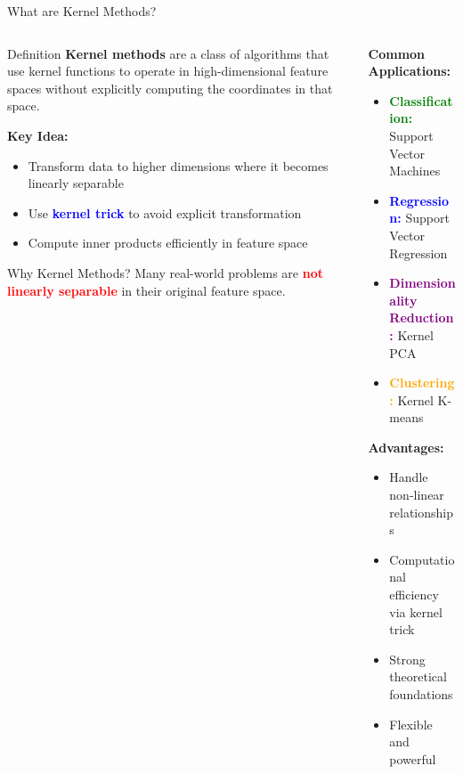 \documentclass[8pt,aspectratio=1610]{beamer}
\begin{document}
\begin{frame}{What are Kernel Methods?}
\begin{columns}[t]
\begin{column}{0.48\textwidth}
\begin{block}{Definition}
\textbf{Kernel methods} are a class of algorithms that use kernel functions to operate in high-dimensional feature spaces without explicitly computing the coordinates in that space.
\end{block}

\vspace{0.3cm}
\textbf{Key Idea:}
\begin{itemize}
\setlength{\itemsep}{1pt}
\item Transform data to higher dimensions where it becomes linearly separable
\item Use \textcolor{blue}{\textbf{kernel trick}} to avoid explicit transformation
\item Compute inner products efficiently in feature space
\end{itemize}

\vspace{0.3cm}
\begin{alertblock}{Why Kernel Methods?}
Many real-world problems are \textcolor{red}{\textbf{not linearly separable}} in their original feature space.
\end{alertblock}
\end{column}

\begin{column}{0.48\textwidth}
\textbf{Common Applications:}
\begin{itemize}
\setlength{\itemsep}{1pt}
\item \textcolor{green}{\textbf{Classification:}} Support Vector Machines
\item \textcolor{blue}{\textbf{Regression:}} Support Vector Regression
\item \textcolor{purple}{\textbf{Dimensionality Reduction:}} Kernel PCA
\item \textcolor{orange}{\textbf{Clustering:}} Kernel K-means
\end{itemize}

\vspace{0.3cm}
\textbf{Advantages:}
\begin{itemize}
\setlength{\itemsep}{1pt}
\item Handle non-linear relationships
\item Computational efficiency via kernel trick
\item Strong theoretical foundations
\item Flexible and powerful
\end{itemize}


\end{column}
\end{columns}
\end{frame}
\end{document}
